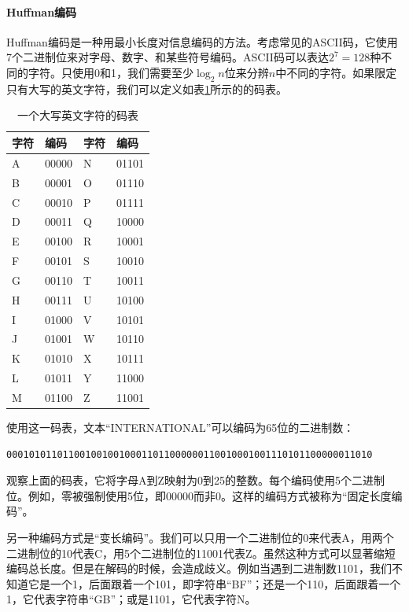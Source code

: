 \documentclass[b5paper]{ctexart}
\begin{document}
\paragraph{Huffman编码}

Huffman编码是一种用最小长度对信息编码的方法。考虑常见的ASCII码，它使用7个二进制位来对字母、数字、和某些符号编码。ASCII码可以表达$2^7 = 128$种不同的字符。只使用0和1，我们需要至少$\log_2 n$位来分辨$n$中不同的字符。如果限定只有大写的英文字符，我们可以定义如表\ref{tab:example-codetable}所示的的码表。

\begin{table}[htbp]
\centering
\begin{tabular}{l|l||l|l}
字符 & 编码 & 字符 & 编码 \\
\hline
A & 00000 & N & 01101 \\
B & 00001 & O & 01110 \\
C & 00010 & P & 01111 \\
D & 00011 & Q & 10000 \\
E & 00100 & R & 10001 \\
F & 00101 & S & 10010 \\
G & 00110 & T & 10011 \\
H & 00111 & U & 10100 \\
I & 01000 & V & 10101 \\
J & 01001 & W & 10110 \\
K & 01010 & X & 10111 \\
L & 01011 & Y & 11000 \\
M & 01100 & Z & 11001 \\
\hline
\end{tabular}
\caption{一个大写英文字符的码表} \label{tab:example-codetable}
\end{table}

使用这一码表，文本“INTERNATIONAL”可以编码为65位的二进制数：

\begin{Verbatim}[fontsize=\footnotesize]
00010101101100100100100011011000000110010001001110101100000011010
\end{Verbatim}

观察上面的码表，它将字母A到Z映射为0到25的整数。每个编码使用5个二进制位。例如，零被强制使用5位，即00000而非0。这样的编码方式被称为“固定长度编码”。

另一种编码方式是“变长编码”。我们可以只用一个二进制位的0来代表A，用两个二进制位的10代表C，用5个二进制位的11001代表Z。虽然这种方式可以显著缩短编码总长度。但是在解码的时候，会造成歧义。例如当遇到二进制数1101，我们不知道它是一个1，后面跟着一个101，即字符串“BF”；还是一个110，后面跟着一个1，它代表字符串“GB”；或是1101，它代表字符N。
\end{document}
